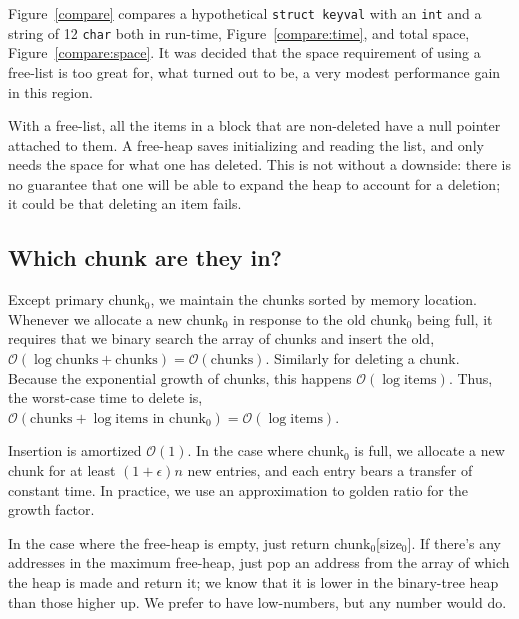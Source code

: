 \documentclass[12pt]{article}
\newcommand{\code}[1]{\colorbox{light-gray}{\texttt{#1}}}
\begin{document}
Figure~\ref{compare} compares a hypothetical \code{struct keyval} with an \code{int} and a string of 12 \code{char} both in run-time, Figure~\ref{compare:time}, and total space, Figure~\ref{compare:space}. It was decided that the space requirement of using a free-list is too great for, what turned out to be, a very modest performance gain in this region.

With a free-list, all the items in a block that are non-deleted have a null pointer attached to them. A free-heap saves initializing and reading the list, and only needs the space for what one has deleted. This is not without a downside: there is no guarantee that one will be able to expand the heap to account for a deletion; it could be that deleting an item fails.

\subsection{Which chunk are they in?}

Except primary chunk$_0$, we maintain the chunks sorted by memory location. Whenever we allocate a new chunk$_0$ in response to the old chunk$_0$ being full, it requires that we binary search the array of chunks and insert the old, $\mathcal{O}(\log \text{chunks} + \text{chunks}) = \mathcal{O}(\text{chunks})$. Similarly for deleting a chunk. Because the exponential growth of chunks, this happens $\mathcal{O}(\log \text{items})$. Thus, the worst-case time to delete is, $\mathcal{O}(\text{chunks} + \log \text{items in chunk$_0$}) = \mathcal{O}(\log \text{items})$.

Insertion is amortized $\mathcal{O}(1)$. In the case where chunk$_0$ is full, we allocate a new chunk for at least $(1+\epsilon)n$ new entries, and each entry bears a transfer of constant time. In practice, we use an approximation to golden ratio for the growth factor.

In the case where the free-heap is empty, just return chunk$_0[$size$_0]$. If there's any addresses in the maximum free-heap, just pop an address from the array of which the heap is made and return it; we know that it is lower in the binary-tree heap than those higher up. We prefer to have low-numbers, but any number would do.
\end{document}

